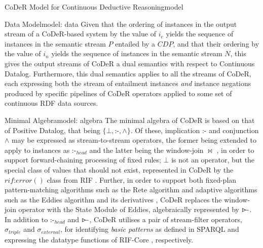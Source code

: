 \begin{nestedsection}{CoDeR Model for Continuous Deductive Reasoning}{model}
\begin{nestedsection}{Data Model}{model: data}
		Given that the ordering of instances in the output stream of a CoDeR-based system by the value of $i_{e}$ yields the sequence of instances in the semantic stream $P$ entailed by a ${CDP}$, and that their ordering by the value of $i_{n}$ yields the sequence of instances in the semantic stream $N$, this gives the output streams of CoDeR a dual semantics with respect to Continuous Datalog.
		Furthermore, this dual semantics applies to all the streams of CoDeR, each expressing both the stream of entailment instances \emph{and} instance negations produced by specific pipelines of CoDeR operators applied to some set of continuous RDF data sources.
	\end{nestedsection}

	\begin{nestedsection}{Minimal Algebra}{model: algebra}
		The minimal algebra of CoDeR is based on that of Positive Datalog, that being ${\{\bot, \text{:-}, \wedge\}}$.
		Of these, implication $\text{:-}$ and conjunction $\wedge$ may be expressed as stream-to-stream operators, the former being extended to apply to instances as $\text{:-}_{head}$ and the latter being the window-join $\Join$ \citep{niagaraCQ}, in order to support forward-chaining processing of fixed rules;
		$\bot$ is not an operator, but the special class of values that should not exist, represented in CoDeR by the ${rif\text{:}error()}$ class from RIF \citep{w3crif}.
		Further, in order to support both fixed-plan pattern-matching algorithms such as the Rete algorithm \citep{forgy79} and adaptive algorithms such as the Eddies algorithm \citep{eddies} and its derivatives \citep{CACQ,TCQ}, CoDeR replaces the window-join operator with the State Module of Eddies, algebraically represented by $\rstreamjoin$.
		In addition to $\text{:-}_{head}$ and $\rstreamjoin$, CoDeR utilises a pair of stream-filter operators, $\sigma_{triple}$ and $\sigma_{external}$, for identifying \emph{basic patterns} as defined in SPARQL \citep{w3csparql} and expressing the datatype functions of RIF-Core \citep{w3crifcore}, respectively.

\end{nestedsection}
\end{nestedsection}
